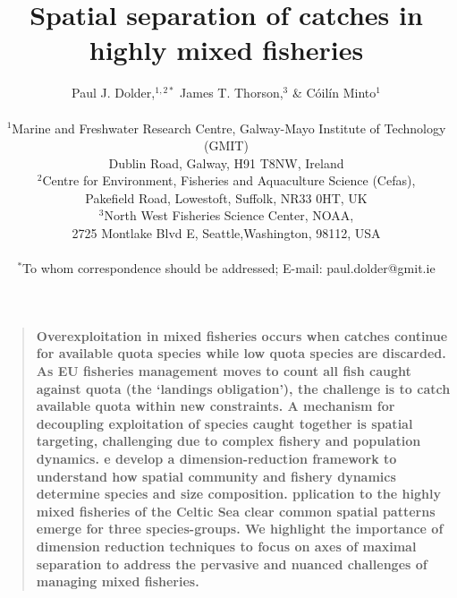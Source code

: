 \documentclass[12pt]{article}
\title{Spatial separation of catches in highly mixed fisheries}
\author
{Paul J. Dolder,$^{1,2\ast}$ James T. Thorson,$^3$ \& Cóilín Minto$^1$\\
\\
\normalsize{$^1$Marine and Freshwater Research Centre, Galway-Mayo Institute of
	Technology (GMIT)}\\
\normalsize{Dublin Road, Galway, H91 T8NW, Ireland}\\
\normalsize{$^2$Centre for Environment, Fisheries and Aquaculture Science
	(Cefas),}\\
\normalsize{Pakefield Road, Lowestoft, Suffolk, NR33 0HT, UK}\\
\normalsize{$^3$North West Fisheries Science Center, NOAA,}\\
\normalsize{2725 Montlake Blvd E, Seattle,Washington, 98112, USA}\\
\\
\normalsize{$^\ast$To whom correspondence should be addressed; E-mail:
	paul.dolder@gmit.ie}
}
\date{}
\newenvironment{sciabstract}{%
\begin{quote} \bf}
{\end{quote}}
\begin{document}
\baselineskip24pt

\maketitle

\begin{linenumbers}

\begin{sciabstract}
	Overexploitation in mixed fisheries occurs when
catches continue for available quota species while low quota species are
discarded. As EU fisheries management moves to count all fish
caught against quota (the `landings obligation'), the challenge is to catch
available quota within new constraints.
A mechanism for decoupling exploitation of species caught together is spatial
targeting,  challenging due to
complex  fishery and population
dynamics.
e develop a dimension-reduction framework to understand how
spatial community and fishery dynamics determine species and size
composition.  
pplication to the highly mixed fisheries of
the Celtic Sea 
clear common spatial patterns emerge for three
species-groups.
We highlight the importance of dimension reduction techniques to focus
on axes of maximal
 separation to address the pervasive and nuanced challenges of managing mixed
fisheries.  
\end{sciabstract}


\end{linenumbers}
\end{document}
